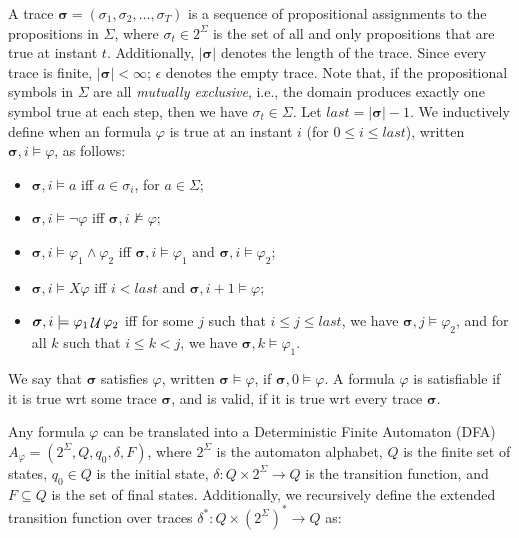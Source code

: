 A trace $\boldsymbol{\sigma} = (\sigma_{1}, \sigma_{2}, \dots, \sigma_{T})$ is a sequence of propositional assignments to the propositions in $\Sigma$, where $\sigma_{t} \in 2^\Sigma$ is the set of all and only propositions that are true at instant $t$. Additionally, $|\boldsymbol{\sigma}|$ denotes the length of the trace. Since every trace is finite, $|\boldsymbol{\sigma}| < \infty$; $\epsilon$ denotes the empty trace.
Note that, if the propositional symbols in $\Sigma$ are all \textit{mutually exclusive}, i.e., the domain produces exactly one symbol true at each step, then we have $\sigma_{t} \in \Sigma$.
%
Let $last = |\boldsymbol{\sigma}| - 1$. We inductively define when
an \ltlf formula $\varphi$ is true at an instant $i$ (for $0 \leq i \leq last$), written $\boldsymbol{\sigma},i \models \varphi$, as follows:
\begin{itemize}
    \item $\boldsymbol{\sigma}, i \models a$ iff $a \in \sigma_i$, for $a \in \Sigma$;
    \item $\boldsymbol{\sigma}, i \models \neg \varphi$ iff $\boldsymbol{\sigma}, i \not\models \varphi$;
    \item $\boldsymbol{\sigma}, i \models \varphi_1 \land \varphi_2$ iff $\boldsymbol{\sigma}, i \models \varphi_1$ and $\boldsymbol{\sigma}, i \models \varphi_2$;
    \item $\boldsymbol{\sigma}, i \models X\varphi$ iff $i < last$ and  $\boldsymbol{\sigma}, i + 1 \models \varphi$;
    \item $\boldsymbol{\sigma}, i \models \varphi_1 \mathop{{\mathcal{U}}} \varphi_2$ iff for some $j$ such that $i \leq j \leq last$, we have $\boldsymbol{\sigma}, j \models \varphi_2$, and for all $k$ such that $i \leq k < j$, we have $\boldsymbol{\sigma}, k \models \varphi_1$.
\end{itemize}
%
\noindent
We say that $\boldsymbol{\sigma}$ satisfies $\varphi$, written $\boldsymbol{\sigma} \models \varphi$, if $\boldsymbol{\sigma}, 0 \models \varphi$. A formula $\varphi$ is satisfiable if it is true wrt some trace $\boldsymbol{\sigma}$, and is valid, if it is true wrt every trace $\boldsymbol{\sigma}$.

Any \ltlf formula $\varphi$ can be translated into a Deterministic Finite Automaton (DFA) \cite{LTLf} $A_\varphi = (2^\Sigma, Q, q_0, \delta, F)$, where $2^\Sigma$ is the automaton alphabet, $Q$ is the finite set of states, $q_0 \in Q$ is the initial state, $\delta: Q \times 2^\Sigma \rightarrow Q$ is the transition function, and $F \subseteq Q$ is the set of final states. 
Additionally, we recursively define the extended transition function over traces $\delta^*: Q \times (2^\Sigma)^* \rightarrow Q$ as:

